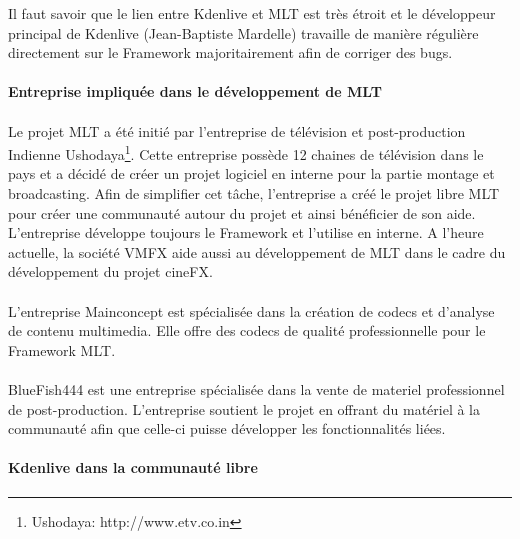 Il faut savoir que le lien entre Kdenlive et MLT est très étroit et le
développeur principal de Kdenlive (Jean-Baptiste Mardelle) travaille
de manière régulière directement sur le Framework majoritairement
afin de corriger des bugs.

\paragraph{Entreprise impliquée dans le développement de MLT}

\paragraph{}

Le projet MLT a été initié par l'entreprise de
télévision et post-production Indienne Ushodaya\footnote{Ushodaya:
http://www.etv.co.in}. Cette entreprise possède 12 chaines de
télévision dans le pays et a décidé de créer un projet logiciel
en interne pour la partie montage et broadcasting. Afin de simplifier
cet tâche, l'entreprise a créé le projet libre MLT pour
créer une communauté autour du projet et ainsi bénéficier de son
aide. L'entreprise développe toujours le Framework et l'utilise
en interne. A l'heure actuelle, la société VMFX aide aussi au
développement de MLT dans le cadre du développement du projet cineFX.

\paragraph{}

L'entreprise Mainconcept est spécialisée dans la création de codecs
et d'analyse de contenu multimedia. Elle offre des codecs de qualité
professionnelle pour le Framework MLT.

\paragraph{}

BlueFish444 est une entreprise spécialisée dans la vente de materiel
professionnel de post-production. L'entreprise soutient le projet
en offrant du matériel  à la communauté afin que celle-ci puisse
développer les fonctionnalités liées.

\newpage\paragraph{Kdenlive dans la communauté libre}


